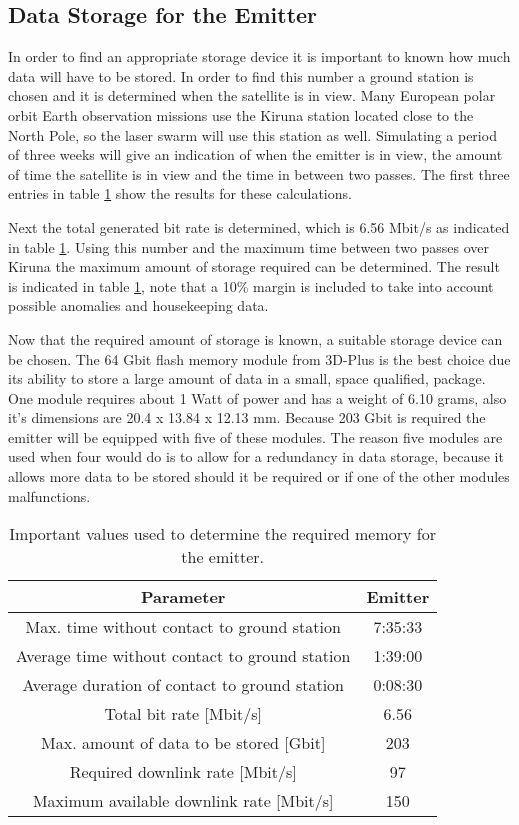 \subsection{Data Storage for the Emitter}
\label{DSEmitter}

In order to find an appropriate storage device it is important to known how much data will have to be stored. In order to find this number a ground station is chosen and it is determined when the satellite is in view. Many European polar orbit Earth observation missions use the Kiruna station located close to the North Pole, so the laser swarm will use this station as well. Simulating a period of three weeks will give an indication of when the emitter is in view, the amount of time the satellite is in view and the time in between two passes. The first three entries in table \ref{DSEmitterTable} show the results for these calculations.

Next the total generated bit rate is determined, which is 6.56 Mbit/s as indicated in table \ref{DSEmitterTable}. Using this number and the maximum time between two passes over Kiruna the maximum amount of storage required can be determined. The result is indicated in table \ref{DSEmitterTable}, note that a 10\% margin is included to take into account possible anomalies and housekeeping data. 

Now that the required amount of storage is known, a suitable storage device can be chosen. The 64 Gbit flash memory module from 3D-Plus \cite{DataStorage} is the best choice due its ability to store a large amount of data in a small, space qualified, package. One module requires about 1 Watt of power and has a weight of 6.10 grams, also it's dimensions are 20.4 x 13.84 x 12.13 mm. Because 203 Gbit is required the emitter will be equipped with five of these modules. The reason five modules are used when four would do is to allow for a redundancy in data storage, because it allows more data to be stored should it be required or if one of the other modules malfunctions.

\begin{table}
\centering
\begin{tabular}{c|c}
\hline
\textbf{Parameter}  & \textbf{Emitter} \\\hline\hline
	Max. time without contact to ground station & 7:35:33 \\
	Average time without contact to ground station & 1:39:00  \\
	Average duration of contact to ground station & 0:08:30 \\
	Total bit rate [Mbit/s] & 6.56 \\
	Max. amount of data to be stored [Gbit] & 203 \\
	Required downlink rate [Mbit/s] & 97 \\
	Maximum available downlink rate [Mbit/s] & 150 \\\hline
\end{tabular}
\caption{Important values used to determine the required memory for the emitter.}
\label{DSEmitterTable}
\end{table}


